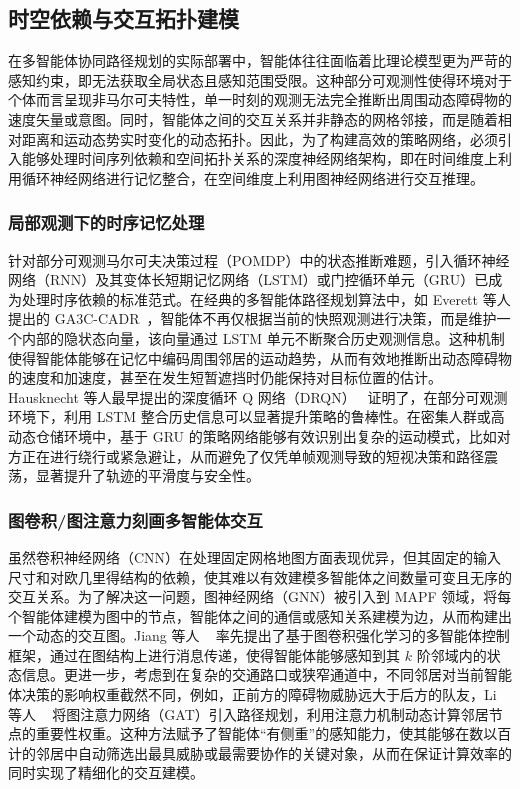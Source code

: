 \documentclass[13.5pt]{extarticle}
\begin{document}
\subsection{时空依赖与交互拓扑建模}

在多智能体协同路径规划的实际部署中，智能体往往面临着比理论模型更为严苛的感知约束，即无法获取全局状态且感知范围受限。这种部分可观测性使得环境对于个体而言呈现非马尔可夫特性，单一时刻的观测无法完全推断出周围动态障碍物的速度矢量或意图。同时，智能体之间的交互关系并非静态的网格邻接，而是随着相对距离和运动态势实时变化的动态拓扑。因此，为了构建高效的策略网络，必须引入能够处理时间序列依赖和空间拓扑关系的深度神经网络架构，即在时间维度上利用循环神经网络进行记忆整合，在空间维度上利用图神经网络进行交互推理。

\subsubsection{局部观测下的时序记忆处理}

针对部分可观测马尔可夫决策过程（POMDP）中的状态推断难题，引入循环神经网络（RNN）及其变体长短期记忆网络（LSTM）或门控循环单元（GRU）已成为处理时序依赖的标准范式。在经典的多智能体路径规划算法中，如 Everett 等人提出的 GA3C-CADR~\cite{everett2018motion}，智能体不再仅根据当前的快照观测进行决策，而是维护一个内部的隐状态向量，该向量通过 LSTM 单元不断聚合历史观测信息。这种机制使得智能体能够在记忆中编码周围邻居的运动趋势，从而有效地推断出动态障碍物的速度和加速度，甚至在发生短暂遮挡时仍能保持对目标位置的估计。Hausknecht 等人最早提出的深度循环 Q 网络（DRQN）~\cite{hausknecht2015deep} 证明了，在部分可观测环境下，利用 LSTM 整合历史信息可以显著提升策略的鲁棒性。在密集人群或高动态仓储环境中，基于 GRU 的策略网络能够有效识别出复杂的运动模式，比如对方正在进行绕行或紧急避让，从而避免了仅凭单帧观测导致的短视决策和路径震荡，显著提升了轨迹的平滑度与安全性。

\subsubsection{图卷积/图注意力刻画多智能体交互}

虽然卷积神经网络（CNN）在处理固定网格地图方面表现优异，但其固定的输入尺寸和对欧几里得结构的依赖，使其难以有效建模多智能体之间数量可变且无序的交互关系。为了解决这一问题，图神经网络（GNN）被引入到 MAPF 领域，将每个智能体建模为图中的节点，智能体之间的通信或感知关系建模为边，从而构建出一个动态的交互图。Jiang 等人 ~\cite{jiang2018graph} 率先提出了基于图卷积强化学习的多智能体控制框架，通过在图结构上进行消息传递，使得智能体能够感知到其 $k$ 阶邻域内的状态信息。更进一步，考虑到在复杂的交通路口或狭窄通道中，不同邻居对当前智能体决策的影响权重截然不同，例如，正前方的障碍物威胁远大于后方的队友，Li 等人 ~\cite{li2020graph} 将图注意力网络（GAT）引入路径规划，利用注意力机制动态计算邻居节点的重要性权重。这种方法赋予了智能体“有侧重”的感知能力，使其能够在数以百计的邻居中自动筛选出最具威胁或最需要协作的关键对象，从而在保证计算效率的同时实现了精细化的交互建模。
\end{document}
